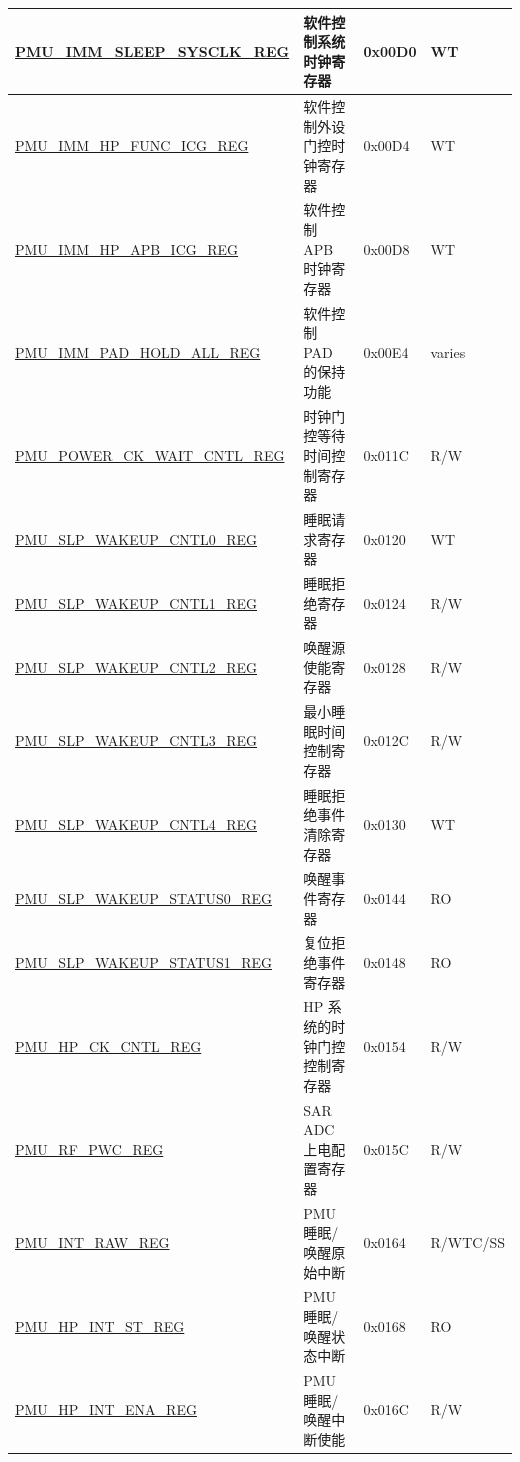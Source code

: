 \begin{longtable}{ | l | L{6cm} | l | l | }
\hyperref[regdesc:PMUIMMSLEEPSYSCLKREG]{PMU\_IMM\_SLEEP\_SYSCLK\_REG} & 软件控制系统时钟寄存器 & 0x00D0 & WT \\ \hline
\hyperref[regdesc:PMUIMMHPFUNCICGREG]{PMU\_IMM\_HP\_FUNC\_ICG\_REG} & 软件控制外设门控时钟寄存器 & 0x00D4 & WT \\ \hline
\hyperref[regdesc:PMUIMMHPAPBICGREG]{PMU\_IMM\_HP\_APB\_ICG\_REG} & 软件控制 APB 时钟寄存器 & 0x00D8 & WT \\ \hline
\hyperref[regdesc:PMUIMMPADHOLDALLREG]{PMU\_IMM\_PAD\_HOLD\_ALL\_REG} & 软件控制 PAD 的保持功能 & 0x00E4 & varies \\ \hline
\hyperref[regdesc:PMUPOWERCKWAITCNTLREG]{PMU\_POWER\_CK\_WAIT\_CNTL\_REG} & 时钟门控等待时间控制寄存器 & 0x011C & R/W \\ \hline
\hyperref[regdesc:PMUSLPWAKEUPCNTL0REG]{PMU\_SLP\_WAKEUP\_CNTL0\_REG} & 睡眠请求寄存器& 0x0120 & WT \\ \hline
\hyperref[regdesc:PMUSLPWAKEUPCNTL1REG]{PMU\_SLP\_WAKEUP\_CNTL1\_REG} & 睡眠拒绝寄存器& 0x0124 & R/W \\ \hline
\hyperref[regdesc:PMUSLPWAKEUPCNTL2REG]{PMU\_SLP\_WAKEUP\_CNTL2\_REG} & 唤醒源使能寄存器& 0x0128 & R/W \\ \hline
\hyperref[regdesc:PMUSLPWAKEUPCNTL3REG]{PMU\_SLP\_WAKEUP\_CNTL3\_REG} & 最小睡眠时间控制寄存器 & 0x012C & R/W \\ \hline
\hyperref[regdesc:PMUSLPWAKEUPCNTL4REG]{PMU\_SLP\_WAKEUP\_CNTL4\_REG} & 睡眠拒绝事件清除寄存器& 0x0130 & WT \\ \hline
\hyperref[regdesc:PMUSLPWAKEUPSTATUS0REG]{PMU\_SLP\_WAKEUP\_STATUS0\_REG} & 唤醒事件寄存器& 0x0144 & RO \\ \hline
\hyperref[regdesc:PMUSLPWAKEUPSTATUS1REG]{PMU\_SLP\_WAKEUP\_STATUS1\_REG} & 复位拒绝事件寄存器& 0x0148 & RO \\ \hline
\hyperref[regdesc:PMUHPCKCNTLREG]{PMU\_HP\_CK\_CNTL\_REG} & HP 系统的时钟门控控制寄存器 & 0x0154 & R/W \\ \hline
\hyperref[regdesc:PMURFPWCREG]{PMU\_RF\_PWC\_REG} & SAR ADC 上电配置寄存器& 0x015C & R/W \\ \hline
\hyperref[regdesc:PMUINTRAWREG]{PMU\_INT\_RAW\_REG} & PMU 睡眠/唤醒原始中断& 0x0164 & R/WTC/SS \\ \hline
\hyperref[regdesc:PMUHPINTSTREG]{PMU\_HP\_INT\_ST\_REG} & PMU 睡眠/唤醒状态中断& 0x0168 & RO \\ \hline
\hyperref[regdesc:PMUHPINTENAREG]{PMU\_HP\_INT\_ENA\_REG} & PMU 睡眠/唤醒中断使能& 0x016C & R/W \\ \hline

\end{longtable}
